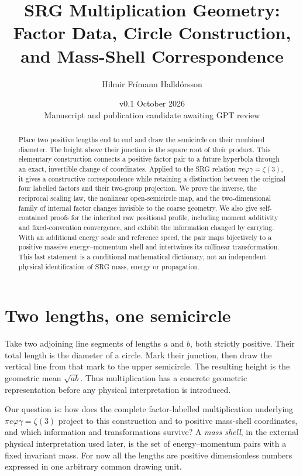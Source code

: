 \documentclass[11pt,a4paper]{article}
\title{\Large SRG Multiplication Geometry:\\Factor Data, Circle Construction,\\and Mass-Shell Correspondence}
\author{Hilmir Frímann Halldórsson}
\date{v0.1 \quad 13 October 2026\\\small Manuscript and publication candidate awaiting GPT review}
\begin{document}
\maketitle
\begin{abstract}
Place two positive lengths end to end and draw the semicircle on their combined diameter. The height above their junction is the square root of their product. This elementary construction connects a positive factor pair to a future hyperbola through an exact, invertible change of coordinates. Applied to the SRG relation $\pi e\varphi\gamma=\zeta(3)$, it gives a constructive correspondence while retaining a distinction between the original four labelled factors and their two-group projection. We prove the inverse, the reciprocal scaling law, the nonlinear open-semicircle map, and the two-dimensional family of internal factor changes invisible to the coarse geometry. We also give self-contained proofs for the inherited raw positional profile, including moment additivity and fixed-convention convergence, and exhibit the information changed by carrying. With an additional energy scale and reference speed, the pair maps bijectively to a positive massive energy--momentum shell and intertwines its collinear transformation. This last statement is a conditional mathematical dictionary, not an independent physical identification of SRG mass, energy or propagation.
\end{abstract}

\section{Two lengths, one semicircle}
\label{sec:circle}
Take two adjoining line segments of lengths $a$ and $b$, both strictly positive. Their total length is the diameter of a circle. Mark their junction, then draw the vertical line from that mark to the upper semicircle. The resulting height is the geometric mean $\sqrt{ab}$. Thus multiplication has a concrete geometric representation before any physical interpretation is introduced.

Our question is: how does the complete factor-labelled multiplication underlying $\pi e\varphi\gamma=\zeta(3)$ project to this construction and to positive mass-shell coordinates, and which information and transformations survive? A \emph{mass shell}, in the external physical interpretation used later, is the set of energy--momentum pairs with a fixed invariant mass. For now all the lengths are positive dimensionless numbers expressed in one arbitrary common drawing unit.
\end{document}
